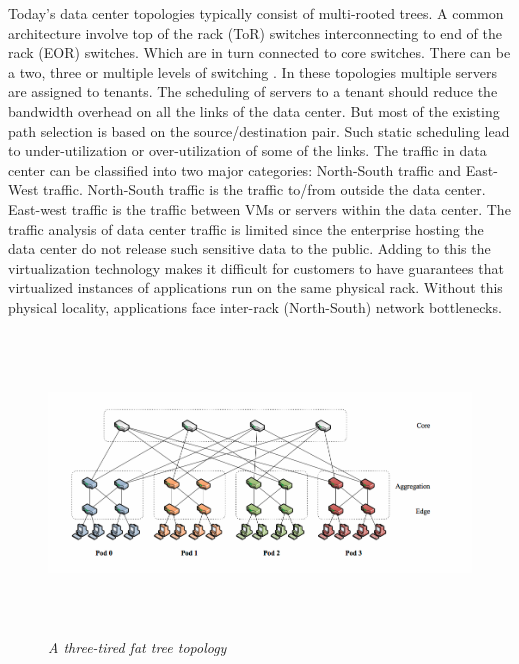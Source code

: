\documentclass[11pt,letterpaper,onecolumn]{article}
\begin{document}
\par{Today's data center topologies typically consist of multi-rooted trees. A common architecture involve top of the rack (ToR) switches interconnecting to end of the rack (EOR) switches. Which are in turn connected to core switches. There can be a two, three or multiple levels of switching \cite{wang2015survey}. In these topologies multiple servers are assigned to tenants. The scheduling of servers to a tenant should reduce the bandwidth overhead on all the links of the data center. But most of the existing path selection is based on the source/destination pair. Such static scheduling lead to under-utilization or over-utilization of some of the links. The traffic in data center can be classified into two major categories: North-South traffic and East-West traffic. North-South traffic is the traffic to/from outside the data center. East-west traffic is the traffic between VMs or servers within the data center. The traffic analysis of data center traffic is limited since the enterprise hosting the data center do not release such sensitive data to the public\cite{song2009multi}. Adding to this the virtualization technology makes it difficult for customers to have guarantees that virtualized instances of applications run on the same physical rack. Without this physical locality, applications face inter-rack (North-South) network bottlenecks.\cite{al2010hedera}}\\

\begin{figure}
\centering
\includegraphics[width=18cm, height=8cm]{fat_tree.png}
\caption{\textit{A three-tired fat tree topology}}
\label{fig:tree}
\end{figure}
\end{document}
